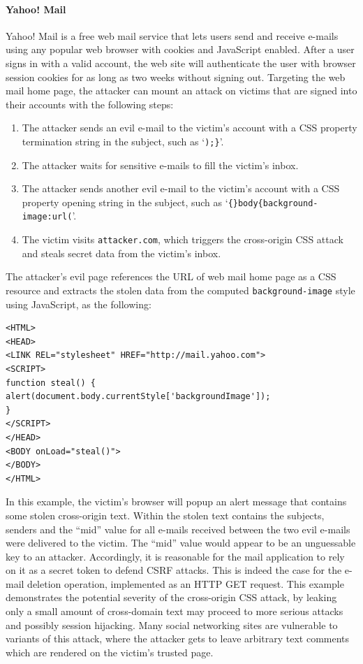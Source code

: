 \documentclass{acm_proc_article-sp}
\begin{document}
\paragraph{Yahoo! Mail} Yahoo! Mail is a free web mail service that lets users send and receive e-mails using any popular web browser with cookies and JavaScript enabled. After a user signs in with a valid account, the web site will authenticate the user with browser session cookies for as long as two weeks without signing out. Targeting the web mail home page, the attacker can mount an attack on victims that are signed into their accounts with the following steps:
\begin{enumerate}
\item{The attacker sends an evil e-mail to the victim's account with a CSS property termination string in the subject, such as `\texttt{);\}}'.}
\item{The attacker waits for sensitive e-mails to fill the victim's inbox.}
\item{The attacker sends another evil e-mail to the victim's account with a CSS property opening string in the subject, such as `\texttt{\{\}body\{background-image:url(}'.}
\item{The victim visits \texttt{attacker.com}, which triggers the cross-origin CSS attack and steals secret data from the victim's inbox.}
\end{enumerate}
The attacker's evil page references the URL of web mail home page as a CSS resource and extracts the stolen data from the computed \texttt{background-image} style using JavaScript, as the following:
\begin{verbatim}
<HTML>
<HEAD>
<LINK REL="stylesheet" HREF="http://mail.yahoo.com">
<SCRIPT>
function steal() {
alert(document.body.currentStyle['backgroundImage']);
}
</SCRIPT>
</HEAD>
<BODY onLoad="steal()">
</BODY>
</HTML>
\end{verbatim}
In this example, the victim's browser will popup an alert message that contains some stolen cross-origin text. Within the stolen text contains the subjects, senders and the ``mid'' value for all e-mails received between the two evil e-mails were delivered to the victim. The ``mid'' value would appear to be an unguessable key to an attacker. Accordingly, it is reasonable for the mail application to rely on it as a secret token to defend CSRF attacks. This is indeed the case for the e-mail deletion operation, implemented as an HTTP GET request. This example demonstrates the potential severity of the cross-origin CSS attack, by leaking only a small amount of cross-domain text may proceed to more serious attacks and possibly session hijacking. Many social networking sites are vulnerable to variants of this attack, where the attacker gets to leave arbitrary text comments which are rendered on the victim's trusted page.
\end{document}
